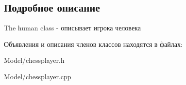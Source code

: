 \subsection{Подробное описание}
The human class -\/ описывает игрока человека 

Объявления и описания членов классов находятся в файлах\+:\begin{DoxyCompactItemize}
\item 
Model/chessplayer.\+h\item 
Model/chessplayer.\+cpp\end{DoxyCompactItemize}
